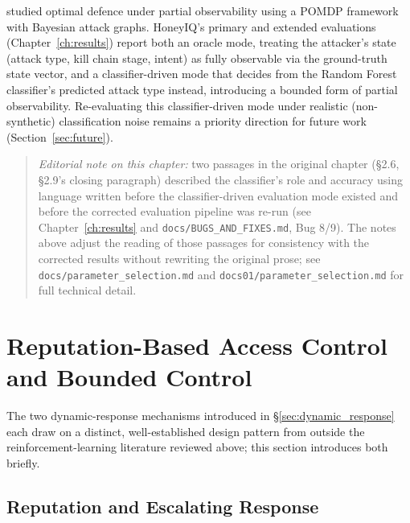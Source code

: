 \citet{miehling2018optimal} studied optimal defence under partial
observability using a POMDP framework with Bayesian attack graphs.
HoneyIQ's primary and extended evaluations (Chapter~\ref{ch:results}) report
both an oracle mode, treating the attacker's state (attack type, kill chain
stage, intent) as fully observable via the ground-truth state vector, and a
classifier-driven mode that decides from the Random Forest classifier's
predicted attack type instead, introducing a bounded form of partial
observability.
Re-evaluating this classifier-driven mode under realistic (non-synthetic)
classification noise remains a priority direction for future work
(Section~\ref{sec:future}).

\begin{quote}
\noindent\textit{Editorial note on this chapter:} two passages in the
original chapter (\S2.6, \S2.9's closing paragraph) described the
classifier's role and accuracy using language written before the
classifier-driven evaluation mode existed and before the corrected
evaluation pipeline was re-run (see Chapter~\ref{ch:results} and
\texttt{docs/BUGS\_AND\_FIXES.md}, Bug 8/9). The notes above adjust the
reading of those passages for consistency with the corrected results
without rewriting the original prose; see
\texttt{docs/parameter\_selection.md} and
\texttt{docs01/parameter\_selection.md} for full technical detail.
\end{quote}

\section{Reputation-Based Access Control and Bounded Control}
\label{sec:bg_repctrl}

The two dynamic-response mechanisms introduced in \S\ref{sec:dynamic_response}
each draw on a distinct, well-established design pattern from outside the
reinforcement-learning literature reviewed above; this section introduces
both briefly.

\subsection{Reputation and Escalating Response}

